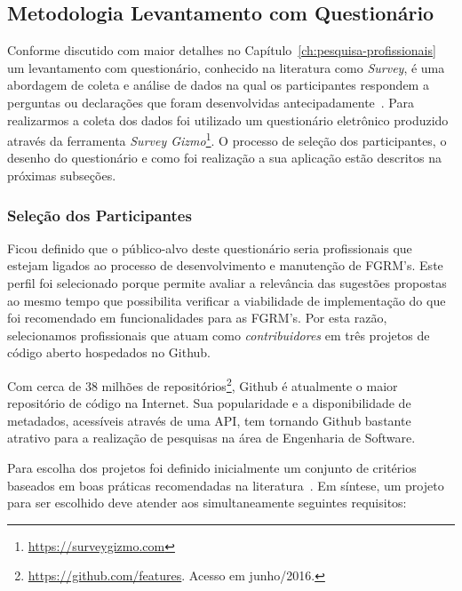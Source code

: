 \subsection{Metodologia Levantamento com Questionário}
\label{sub:sug_melhoria_metodologia_levantamento}

Conforme discutido com maior detalhes no
Capítulo~\ref{ch:pesquisa-profissionais} um levantamento com questionário,
conhecido na literatura como \textit{Survey}, é uma abordagem de coleta e
análise de dados na qual os participantes respondem a perguntas ou declarações
que foram desenvolvidas antecipadamente~\cite{kasunic2005designing}.  Para
realizarmos a coleta dos dados foi utilizado um questionário eletrônico
produzido através da ferramenta \textit{Survey
	Gizmo}\footnote{\url{https://surveygizmo.com}}. O processo de seleção dos
participantes, o desenho do questionário e como foi realização a sua aplicação
estão descritos na próximas subseções.

\subsubsection{Seleção dos Participantes}
\label{ssub:sug_melhoria_selecao_participantes}

Ficou definido que o público-alvo deste questionário seria profissionais que
estejam ligados ao processo de desenvolvimento e manutenção de FGRM's. Este
perfil foi selecionado porque permite avaliar a relevância das sugestões
propostas ao mesmo tempo que possibilita verificar a viabilidade de
implementação do que foi recomendado em funcionalidades para as FGRM's. Por esta
razão, selecionamos profissionais que atuam como \textit{contribuidores} em três
projetos de código aberto hospedados no Github.

Com cerca de 38 milhões de
repositórios\footnote{\url{https://github.com/features}. Acesso em junho/2016.},
Github é atualmente o maior repositório de código na Internet. Sua popularidade
e a disponibilidade de metadados, acessíveis através de uma API, tem tornando
Github bastante atrativo para a realização de pesquisas na área de Engenharia de
Software.

Para escolha dos projetos foi definido inicialmente um conjunto de critérios
baseados em boas práticas recomendadas na literatura~\cite{Bird2009}. Em
síntese, um projeto para ser escolhido deve atender aos simultaneamente
seguintes requisitos:

